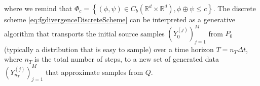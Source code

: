 \documentclass{amsart}
\theoremstyle{definition}
\theoremstyle{remark}
\numberwithin{equation}{section}
\begin{document}
where we remind that $\Phi_c = \left\{ (\phi, \psi) \in C_b(\mathbb{R}^d\times \mathbb{R}^d), \phi \oplus \psi \le c \right\}$. The discrete scheme \eqref{eq:fgdivergenceDiscreteScheme} can be interpreted as a generative algorithm that transports the initial source samples $(Y_0^{(j)})_{j=1}^M$ from $P_0$ (typically  a distribution that is easy to sample) over a time horizon $T=n_T\Delta t$,  where $n_T$ is the total number of steps, to  a new set of generated data $(Y_{n_T}^{(j)})_{j=1}^M$ that approximate samples from $Q$. 

\end{document}
